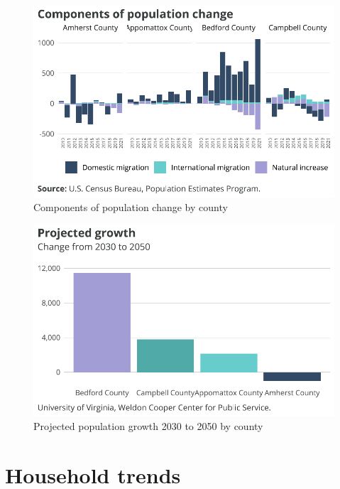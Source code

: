 \documentclass[
  letterpaper,
  DIV=11,
  numbers=noendperiod]{scrreprt}
\begin{document}
\begin{figure}[H]

{\centering \includegraphics{./part-3-2_files/figure-pdf/fig-local-chg-1.pdf}

}

\caption{\label{fig-local-chg}Components of population change by county}

\end{figure}

\begin{figure}[H]

{\centering \includegraphics{./part-3-2_files/figure-pdf/fig-localproj-1.pdf}

}

\caption{\label{fig-localproj}Projected population growth 2030 to 2050
by county}

\end{figure}

\hypertarget{household-trends-1}{%
\section{Household trends}\label{household-trends-1}}
\end{document}

